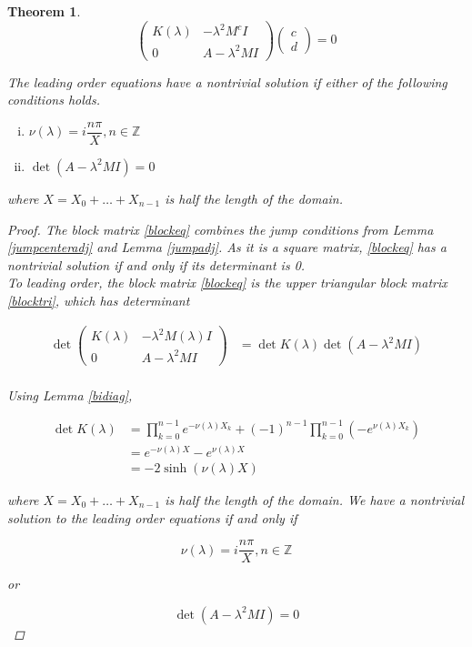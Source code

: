 \documentclass[12pt]{article}
\def\Z{{\mathbb Z}}
\newtheorem{theorem}{Theorem}
\begin{document}
\begin{theorem}
\begin{equation}\label{blocktri}
\begin{pmatrix}
K(\lambda) & -\lambda^2 M^c I  \\
0 & A - \lambda^2 MI 
\end{pmatrix}
\begin{pmatrix}c \\ d \end{pmatrix} = 0
\end{equation}

The leading order equations have a nontrivial solution if either of the following conditions holds.

\begin{enumerate}[(i)]
\item $\nu(\lambda) = i \dfrac{n \pi}{X}, n \in \Z$ 
\item $\det(A - \lambda^2 MI) = 0$
\end{enumerate}

where $X = X_0 + \dots + X_{n-1}$ is half the length of the domain. 

\begin{proof}
The block matrix \eqref{blockeq} combines the jump conditions from Lemma \ref{jumpcenteradj} and Lemma \ref{jumpadj}. As it is a square matrix, \eqref{blockeq} has a nontrivial solution if and only if its determinant is 0.\\

To leading order, the block matrix \eqref{blockeq} is the upper triangular block matrix \eqref{blocktri}, which has determinant 

\begin{align*}
\det \begin{pmatrix}
K(\lambda) & -\lambda^2 M(\lambda) I \\
0 & A - \lambda^2 MI
\end{pmatrix} &= \det K(\lambda) \det(A - \lambda^2 MI)\\
\end{align*}

Using Lemma \ref{bidiag}, 

\begin{align*}
\det K(\lambda) &= \prod_{k = 0}^{n-1} e^{-\nu(\lambda)X_k} + (-1)^{n-1} \prod_{k = 0}^{n-1} (-e^{\nu(\lambda)X_k}) \\
&= e^{-\nu(\lambda) X} - e^{\nu(\lambda) X} \\
&= -2 \sinh( \nu(\lambda) X )
\end{align*}

where $X = X_0 + \dots + X_{n-1}$ is half the length of the domain. We have a nontrivial solution to the leading order equations if and only if 

\[
\nu(\lambda) = i \frac{n \pi}{X}, n \in \Z
\]

or 

\[
\det(A - \lambda^2 MI) = 0
\]

\end{proof}
\end{theorem}
\end{document}
